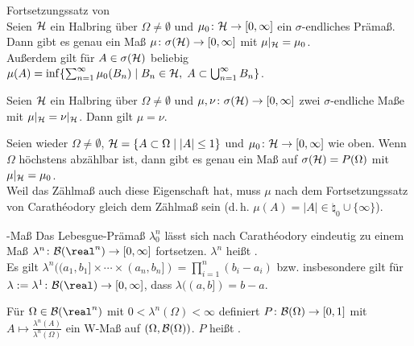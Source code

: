 \linie

\begin{Satz}{Fortsetzungssatz von \upshape\,\!}\\
    Seien $\mathcal{H}$ ein Halbring über $\Omega \not= \emptyset$ und
    $\mu_0\colon \mathcal{H} \rightarrow [0, \infty]$ ein $\sigma$-endliches Prämaß.\\
    Dann gibt es genau ein Maß $\mu\colon \sigma(\mathcal{H}) \rightarrow [0, \infty]$ mit
    $\mu|_{\mathcal{H}} = \mu_0$.\\
    Außerdem gilt für $A \in \sigma(\mathcal{H})$ beliebig
    $\mu(A) = \inf\{\sum_{n=1}^\infty \mu_0(B_n) \;|\;
    B_n \in \mathcal{H},\; A \subset \bigcup_{n=1}^\infty B_n\}$.
\end{Satz}

\begin{Kor}
    Seien $\mathcal{H}$ ein Halbring über $\Omega \not= \emptyset$ und
    $\mu, \nu\colon \sigma(\mathcal{H}) \rightarrow [0, \infty]$ zwei $\sigma$-endliche Maße
    mit $\mu|_{\mathcal{H}} = \nu|_{\mathcal{H}}$.
    Dann gilt $\mu = \nu$.
\end{Kor}

\begin{Bsp}
    Seien wieder $\Omega \not= \emptyset$, $\mathcal{H} = \{A \subset \Omega \;|\; |A| \le 1\}$ und
    $\mu_0\colon \mathcal{H} \rightarrow [0, \infty]$ wie oben.
    Wenn $\Omega$ höchstens abzählbar ist, dann gibt es genau ein Maß auf
    $\sigma(\mathcal{H}) = P(\Omega)$ mit $\mu|_{\mathcal{H}} = \mu_0$.\\
    Weil das Zählmaß auch diese Eigenschaft hat, muss $\mu$ nach dem Fortsetzungssatz von
    Carathéodory gleich dem Zählmaß sein
    (d.\,h. $\mu(A) = |A| \in \natural_0 \cup \{\infty\}$).
\end{Bsp}

\linie

\begin{Def}{-Maß}
    Das Lebesgue-Prämaß $\lambda_0^n$ lässt sich nach Carathéodory eindeutig zu einem Maß
    $\lambda^n\colon \B(\real^n) \rightarrow [0, \infty]$ fortsetzen.
    $\lambda^n$ heißt .\\
    Es gilt $\lambda^n((a_1, b_1] \times \dotsb \times (a_n, b_n]) = \prod_{i=1}^n (b_i - a_i)$
    bzw. insbesondere gilt für\\
    $\lambda := \lambda^1\colon \B(\real) \rightarrow [0, \infty]$,
    dass $\lambda((a, b]) = b - a$.
\end{Def}

\begin{Bsp}
    Für $\Omega \in \B(\real^n)$ mit $0 < \lambda^n(\Omega) < \infty$ definiert
    $P\colon \mathcal{B}(\Omega) \rightarrow [0, 1]$ mit $A \mapsto \frac{\lambda^n(A)}{\lambda^n(\Omega)}$
    ein W-Maß auf $(\Omega, \mathcal{B}(\Omega))$.
    $P$ heißt .
\end{Bsp}

